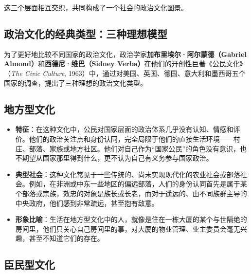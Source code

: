 这三个层面相互交织，共同构成了一个社会的政治文化图景。

\subsection{政治文化的经典类型：三种理想模型}

为了更好地比较不同国家的政治文化，政治学家\textbf{加布里埃尔·阿尔蒙德（Gabriel Almond）}和\textbf{西德尼·维巴（Sidney Verba）}在他们的开创性巨著《公民文化》（\textit{The Civic Culture}, 1963）中，通过对美国、英国、德国、意大利和墨西哥五个国家的调查，提出了三种理想的政治文化类型。

\subsection{地方型文化}

\begin{itemize}
    \item \textbf{特征}：在这种文化中，公民对国家层面的政治体系几乎没有认知、情感和评价。他们的政治关注点和身份认同，完全局限于他们的直接生活环境——村庄、部落、家族或地方社区。他们对自己作为“国家公民”的角色没有意识，也不期望从国家那里得到什么，更不认为自己有义务参与国家政治。
    \item \textbf{典型社会}：这种文化常见于一些传统的、尚未实现现代化的农业社会或部落社会。例如，在非洲或中东一些地区的偏远部落，人们的身份认同首先是属于某个部落或宗族，效忠的对象是族长或长老，而对于遥远的、由不同族群主导的中央政府，他们感到非常疏远，甚至抱有敌意。
    \item \textbf{形象比喻}：生活在地方型文化中的人，就像是住在一栋大厦的某个与世隔绝的房间里，他们只关心自己房间里的事，对大厦的物业管理、业主委员会毫无兴趣，甚至不知道它们的存在。
\end{itemize}

\subsection{臣民型文化}

